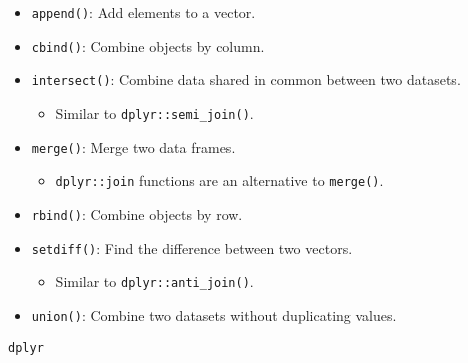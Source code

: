 \documentclass[
]{book}
\providecommand{\tightlist}{%
  \setlength{\itemsep}{0pt}\setlength{\parskip}{0pt}}
\begin{document}
\begin{itemize}
\tightlist
\item
  \texttt{append()}: Add elements to a vector.
\item
  \texttt{cbind()}: Combine objects by column.
\item
  \texttt{intersect()}: Combine data shared in common between two datasets.

  \begin{itemize}
  \tightlist
  \item
    Similar to \texttt{dplyr::semi\_join()}.
  \end{itemize}
\item
  \texttt{merge()}: Merge two data frames.

  \begin{itemize}
  \tightlist
  \item
    \texttt{dplyr::join} functions are an alternative to \texttt{merge()}.
  \end{itemize}
\item
  \texttt{rbind()}: Combine objects by row.
\item
  \texttt{setdiff()}: Find the difference between two vectors.

  \begin{itemize}
  \tightlist
  \item
    Similar to \texttt{dplyr::anti\_join()}.
  \end{itemize}
\item
  \texttt{union()}: Combine two datasets without duplicating values.
\end{itemize}

\texttt{dplyr}
\end{document}
